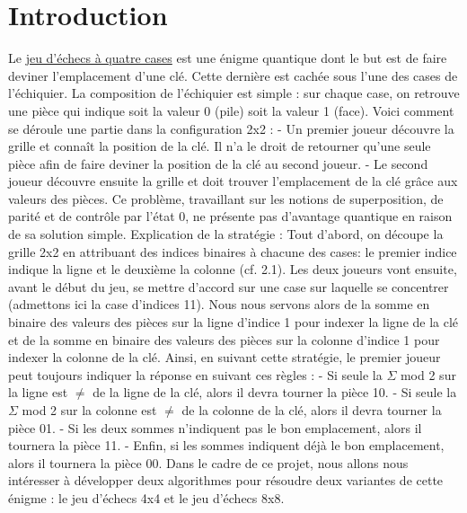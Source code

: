 \documentclass[12pt]{article}
\begin{document}
\section{Introduction}
Le \href{https://www.youtube.com/watch?v=LFwXghcajLw&list=PLtn704u3JW-K4q9YkQWTfWRxaq-9oLfJ3&index=4}{jeu d'échecs à quatre cases} est une énigme quantique dont le but est de faire deviner l'emplacement d'une clé. Cette dernière est cachée sous l'une des cases de l'échiquier.\newline
\newline
La composition de l'échiquier est simple : sur chaque case, on retrouve une pièce qui indique soit la valeur 0 (pile) soit la valeur 1 (face).\newline
\newline
Voici comment se déroule une partie dans la configuration 2x2 :
\newline
- Un premier joueur découvre la grille et connaît la position de la clé. Il n'a le droit de retourner qu'une seule pièce afin de faire deviner la position de la clé au second joueur.
\newline
- Le second joueur découvre ensuite la grille et doit trouver l'emplacement de la clé grâce aux valeurs des pièces.\newline
\newline
Ce problème, travaillant sur les notions de superposition, de parité et de contrôle par l'état 0, ne présente pas d'avantage quantique en raison de sa solution simple.\newline
\newline
Explication de la stratégie :\newline
Tout d'abord, on découpe la grille 2x2 en attribuant des indices binaires à chacune des cases: le premier indice indique la ligne et le deuxième la colonne (cf. 2.1).\newline
Les deux joueurs vont ensuite, avant le début du jeu, se mettre d'accord sur une case sur laquelle se concentrer (admettons ici la case d'indices 11). Nous nous servons alors de la somme en binaire des valeurs des pièces sur la ligne d'indice 1 pour indexer la ligne de la clé et de la somme en binaire des valeurs des pièces sur la colonne d'indice 1 pour indexer la colonne de la clé.\newline
Ainsi, en suivant cette stratégie, le premier joueur peut toujours indiquer la réponse en suivant ces règles :\newline
- Si seule la $\Sigma$ mod 2 sur la ligne est $\ne$ de la ligne de la clé, alors il devra tourner la pièce 10.\newline
- Si seule la $\Sigma$ mod 2 sur la colonne est $\ne$ de la colonne de la clé, alors il devra tourner la pièce 01.\newline
- Si les deux sommes n'indiquent pas le bon emplacement, alors il tournera la pièce 11.\newline
- Enfin, si les sommes indiquent déjà le bon emplacement, alors il tournera la pièce 00.\newline
\newline
Dans le cadre de ce projet, nous allons nous intéresser à développer deux algorithmes pour résoudre deux variantes de cette énigme : le jeu d'échecs 4x4 et le jeu d'échecs 8x8.
  
\end{document}
